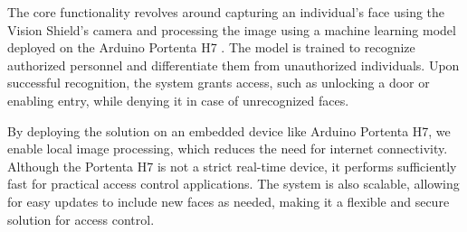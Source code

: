 The core functionality revolves around capturing an individual's face using the Vision Shield’s camera and processing the image using a machine learning model deployed on the Arduino Portenta H7 \cite{arduinoVisionShield:2024}. The model is trained to recognize authorized personnel and differentiate them from unauthorized individuals. Upon successful recognition, the system grants access, such as unlocking a door or enabling entry, while denying it in case of unrecognized faces.
\begin{comment}
	This system is particularly useful in:
	\begin{itemize}
		\item \textbf{Corporate Offices:} Controlling access to different departments or secured rooms.
		\item \textbf{Residential Buildings:} Granting entry to residents while keeping out unauthorized individuals.
		\item \textbf{Data Centers or Server Rooms:} Providing access only to authorized personnel.
	\end{itemize}
\end{comment}

By deploying the solution on an embedded device like Arduino Portenta H7, we enable local image processing, which reduces the need for internet connectivity. Although the Portenta H7 \cite{portentaH7doc:2024} is not a strict real-time device, it performs sufficiently fast for practical access control applications. The system is also scalable, allowing for easy updates to include new faces as needed, making it a flexible and secure solution for access control.

